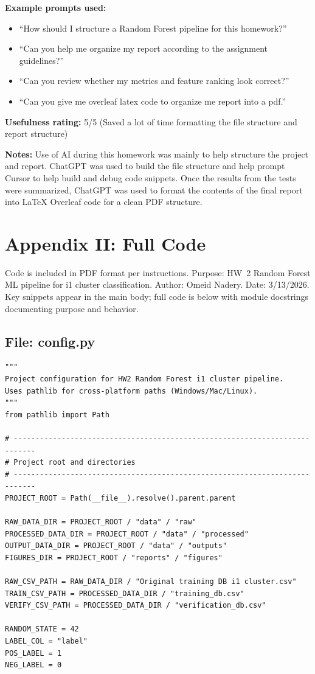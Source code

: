 \documentclass[11pt]{article}
\begin{document}
\textbf{Example prompts used:}
\begin{itemize}[leftmargin=1.5em]
    \item ``How should I structure a Random Forest pipeline for this homework?''
    \item ``Can you help me organize my report according to the assignment guidelines?''
    \item ``Can you review whether my metrics and feature ranking look correct?''
    \item ``Can you give me overleaf latex code to organize me report into a pdf.''
\end{itemize}

\textbf{Usefulness rating:} 5/5 (Saved a lot of time formatting the file structure and report structure)

\textbf{Notes:} Use of AI during this homework was mainly to help structure the project and report. ChatGPT was used to build the file structure and help prompt Cursor to help build and debug code snippets. Once the results from the tests were summarized, ChatGPT was used to format the contents of the final report into LaTeX Overleaf code for a clean PDF structure.

\section{Appendix II: Full Code}

Code is included in PDF format per instructions. Purpose: HW~2 Random Forest ML pipeline for i1 cluster classification. 
Author: Omeid Nadery. Date: 3/13/2026. Key snippets appear in the main body; full code is below with module docstrings documenting purpose and behavior.

\subsection*{File: config.py}

\begin{lstlisting}[style=pythonstyle]
"""
Project configuration for HW2 Random Forest i1 cluster pipeline.
Uses pathlib for cross-platform paths (Windows/Mac/Linux).
"""
from pathlib import Path

# ---------------------------------------------------------------------------
# Project root and directories
# ---------------------------------------------------------------------------
PROJECT_ROOT = Path(__file__).resolve().parent.parent

RAW_DATA_DIR = PROJECT_ROOT / "data" / "raw"
PROCESSED_DATA_DIR = PROJECT_ROOT / "data" / "processed"
OUTPUT_DATA_DIR = PROJECT_ROOT / "data" / "outputs"
FIGURES_DIR = PROJECT_ROOT / "reports" / "figures"

RAW_CSV_PATH = RAW_DATA_DIR / "Original training DB i1 cluster.csv"
TRAIN_CSV_PATH = PROCESSED_DATA_DIR / "training_db.csv"
VERIFY_CSV_PATH = PROCESSED_DATA_DIR / "verification_db.csv"

RANDOM_STATE = 42
LABEL_COL = "label"
POS_LABEL = 1
NEG_LABEL = 0
\end{lstlisting}
\end{document}
